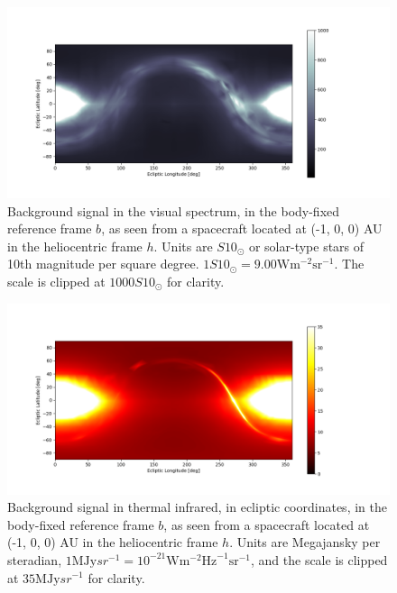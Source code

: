 \begin{figure}[htbp]
 \centering
 \includegraphics[width=1.0\textwidth]{img/background_vis_combined.png}
 \caption{Background signal in the visual spectrum, in the body-fixed reference frame $b$, as seen from a spacecraft located at (-1, 0, 0) AU in the heliocentric frame $h$. Units are $S10_\odot$ or solar-type stars of 10th magnitude per square degree. $1S10_\odot = 9.00\mathrm{W}\mathrm{m}^{-2}\mathrm{sr}^{-1}$. The scale is clipped at $1000 S10_\odot$ for clarity.}
 \label{fig:combinedvisbackground}
\end{figure}

\begin{figure}[htbp]
 \centering
 \includegraphics[width=1.0\textwidth]{img/background_tir_combined.png}
 \caption{Background signal in thermal infrared, in ecliptic coordinates, in the body-fixed reference frame $b$, as seen from a spacecraft located at (-1, 0, 0) AU in the heliocentric frame $h$. Units are Megajansky per steradian, $1 \mathrm{MJy}{sr}^{-1} = 10^{-21} \mathrm{W}\mathrm{m}^{-2}\mathrm{Hz}^{-1}\mathrm{sr}^{-1}$, and the scale is clipped at $35 \mathrm{MJy}{sr}^{-1}$ for clarity.}
 \label{fig:combinedtirbackground}
\end{figure}

